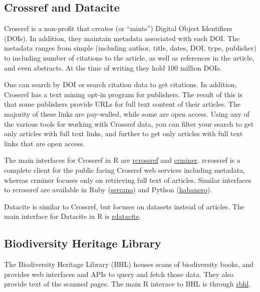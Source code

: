 \documentclass[author-year, review, 11pt]{components/elsarticle} %
\begin{document}
\hypertarget{crossref-and-datacite}{%
\subsection{Crossref and Datacite}\label{crossref-and-datacite}}

Crossref is a non-profit that creates (or ``mints'') Digital Object
Identifiers (DOIs). In addition, they maintain metadata associated with
each DOI. The metadata ranges from simple (including author, title,
dates, DOI, type, publisher) to including number of citations to the
article, as well as references in the article, and even abstracts. At
the time of writing they hold 100 million DOIs.

One can search by DOI or search citation data to get citations. In
addition, Crossref has a text mining opt-in program for publishers. The
result of this is that some publishers provide URLs for full text
content of their articles. The majority of these links are pay-walled,
while some are open access. Using any of the various tools for working
with Crossref data, you can filter your search to get only articles with
full text links, and further to get only articles with full text links
that are open access.

The main interfaces for Crossref in R are
\href{https://github.com/ropensci/rcrossref}{rcrossref} and
\href{https://github.com/ropensci/crminer}{crminer}. rcrossref is a
complete client for the public facing Crossref web services including
metadata, whereas crminer focuses only on retrieving full text of
articles. Similar interfaces to rcrossref are available in Ruby
(\href{https://github.com/sckott/serrano}{serrano}) and Python
(\href{https://github.com/sckott/habanero}{habanero}).

Datacite is similar to Crossref, but focuses on datasets instead of
articles. The main interface for Datacite in R is
\href{https://github.com/ropensci/rdatacite}{rdatacite}.

\hypertarget{biodiversity-heritage-library}{%
\subsection{Biodiversity Heritage
Library}\label{biodiversity-heritage-library}}

The Biodiversity Heritage Library (BHL) houses scans of biodiversity
books, and provides web interfaces and APIs to query and fetch those
data. They also provide text of the scanned pages. The main R interace
to BHL is through \href{https://github.com/ropensci/rbhl}{rbhl}.
\end{document}
